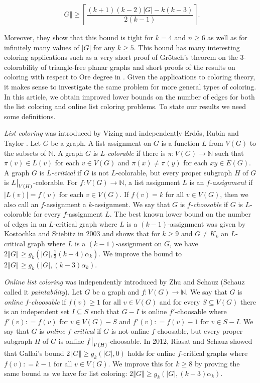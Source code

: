 \documentclass[12pt]{article}
\theoremstyle{plain}
\theoremstyle{definition}
\theoremstyle{remark}
\newcommand{\IN}{\mathbb{N}}
\newcommand{\card}[1]{\left|#1\right|}
\newcommand{\size}[1]{\left\Vert#1\right\Vert}
\newcommand{\ceil}[1]{\left\lceil#1\right\rceil}
\newcommand{\func}[3]{#1\colon #2 \rightarrow #3}
\newcommand{\DefinedAs}{\mathrel{\mathop:}=}
\newcommand\restr[2]{{%
  \left.\kern-\nulldelimiterspace %
  #1 %
  \vphantom{\big|} %
  \right|_{#2} %
  }}
\begin{document}
\[\size{G} \geq \ceil{\frac{(k+1)(k-2)\card{G} - k(k-3)}{2(k-1)}}.\]

Moreover, they show that this bound is tight for $k=4$ and $n \geq 6$ as well as for infinitely many values of $\card{G}$ for any $k \geq 5$.  This bound has many interesting coloring applications such as a very short proof of Gr\"otsch's theorem on the $3$-colorability of triangle-free planar graphs \cite{kostochka2012oregrotsch} and short proofs of the results on coloring with respect to Ore degree in \cite{kierstead2009ore, rabern2010a, krs_one}.  Given the applications to coloring theory, it makes sense to investigate the same problem for more general types of coloring.  In this article, we obtain improved lower bounds on the number of edges for both the list coloring and online list coloring problems.  To state our results we need some definitions.

\emph{List coloring} was introduced by Vizing \cite{vizing1976} and independently Erd\H{o}s, Rubin and Taylor \cite{erdos1979choosability}.  Let $G$ be a graph. A list assignment on $G$ is a function $L$ from $V(G)$ to the subsets of $\IN$.   A graph $G$ is \emph{$L$-colorable} if there is $\func{\pi}{V(G)}{\IN}$ such that $\pi(v) \in L(v)$ for each $v \in V(G)$ and $\pi(x) \neq \pi(y)$ for each $xy \in E(G)$.   A graph $G$ is \emph{$L$-critical} if $G$ is not $L$-colorable, but every proper subgraph $H$ of $G$ is $\restr{L}{V(H)}$-colorable. For $\func{f}{V(G)}{\IN}$, a list assignment $L$ is an \emph{$f$-assignment} if $\card{L(v)} = f(v)$ for each $v \in V(G)$.  If $f(v) = k$ for all $v \in V(G)$, then we also call an $f$-assignment a $k$-assignment.  We say that $G$ is \emph{$f$-choosable} if $G$ is $L$-colorable for every $f$-assignment $L$.  The best known lower bound on the number of edges in an $L$-critical graph where $L$ is a $(k-1)$-assignment was given by Kostochka and Stiebitz \cite{kostochkastiebitzedgesincriticalgraph} in 2003 and shows that for $k \geq 9$ and $G \neq K_k$ an $L$-critical graph where $L$ is a $(k-1)$-assignment on $G$, we have $2\size{G} \geq g_k(\card{G}, \frac13 (k-4)\alpha_k)$.  We improve the bound to $2\size{G} \geq g_k(\card{G}, (k-3)\alpha_k)$.

\emph{Online list coloring} was independently introduced by Zhu \cite{zhu2009online} and Schauz \cite{schauz2009mr} (Schauz called it \emph{paintability}). Let $G$ be a graph and $\func{f}{V(G)}{\IN}$.  We say that $G$ is \emph{online $f$-choosable} if $f(v) \geq 1$ for all $v \in V(G)$ and for every $S \subseteq V(G)$ there is an independent set $I \subseteq S$ such that $G-I$ is online $f'$-choosable where $f'(v) \DefinedAs f(v)$ for $v \in V(G) - S$ and $f'(v) \DefinedAs f(v) - 1$ for $v \in S - I$.  We say that $G$ is \emph{online $f$-critical} if $G$ is not online $f$-choosable, but every proper subgraph $H$ of $G$ is online $\restr{f}{V(H)}$-choosable.  In 2012, Riasat and Schauz \cite{riasat2012critically} showed that Gallai's bound  $2\size{G} \geq g_k(\card{G}, 0)$ holds for online $f$-critical graphs where $f(v) \DefinedAs k-1$ for all $v \in V(G)$.  We improve this for $k \geq 8$ by proving the same bound as we have for list coloring: $2\size{G} \geq g_k(\card{G}, (k-3)\alpha_k)$.
\end{document}
